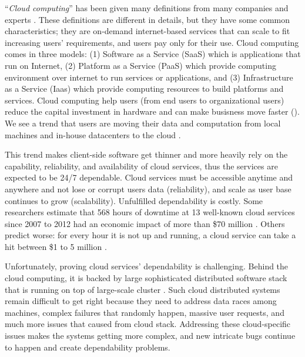 ``\textit{Cloud computing}'' has been given many definitions from many companies
and experts \cite{TwentyoneCloudDef, IBMCloudDef, PCMagCloudDef,
Foster+08-CloudAndGrid}. These definitions are different in details, but they
have some common characteristics; they are on-demand internet-based services
that can scale to fit increasing users' requirements, and users pay only for
their use. Cloud computing comes in three models: (1) Software as a Service
(SaaS) which is applications that run on Internet, (2) Platform as a Service
(PaaS) which provide computing environment over internet to run services or
applications, and (3) Infrastructure as a Service (Iaas) which provide computing
resources to build platforms and services.
%
Cloud computing help users (from end users to organizational users) reduce the
capital investment in hardware and can make busisness move faster (). We see a trend that users are moving their data and computation from
local machines and in-house datacenters to the cloud \cite{AdobeCloudStat,
AWSCustomer, GmailStat, GoogleDriveStat, DropboxStat, FacebookStat} .

This trend makes client-side software get thinner and more heavily rely on the
capability, reliability, and availability of cloud services, thus the services
are expected to be 24/7 dependable. Cloud services must be accessible anytime
and anywhere and not lose or corrupt users data (reliability), and scale as user
base continues to grow (scalability). 
%
Unfulfilled dependability is costly. Some researchers estimate that 568 hours of
downtime at 13 well-known cloud services since 2007 to 2012 had an economic
impact of more than \$70 million \cite{Essers12-70Million}. Others predict
worse: for every hour it is not up and running, a cloud service can take a hit
between \$1 to 5 million \cite{Linthicum13-InfoworldCostOutages}.

Unfortunately, proving cloud services' dependability is challenging. Behind the
cloud computing, it is backed by large sophisticated distributed software stack
\cite{Burrows06-Chubby, Chang+06-BigTable, Chapin+95-Hive, Corbett+12-Spanner,
DeanGhemawat04-MapReduce, DeCandia+07-Dynamo, Ghemawat+03-GoogleFS,
Hunt+10-ZooKeeperPaper,  Lakshman+09-Cassandra, Melnik+10-DremelInteractive,
Zaharia+12-RDD} that is running on top of large-scale cluster .
Such cloud distributed systems remain difficult to get right because they need
to address data races among machines, complex failures that randomly happen,
massive user requests, and much more issues that caused from cloud stack.
Addressing these cloud-specific issues makes the systems getting more complex,
and new intricate bugs continue to happen and create dependability problems.


